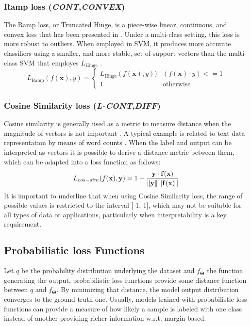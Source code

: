 \documentclass[sn-mathphys-num]{sn-jnl}%
\newcommand \cont{\textit{CONT}}
\newcommand \lcont{\textit{L-CONT}}
\newcommand \diff{\textit{DIFF}}
\newcommand \conv{\textit{CONVEX}}
\renewcommand\vec{\mathbf}
\begin{document}
\subsubsection{Ramp loss (\cont,\conv)}\label{ramp_loss}
The Ramp loss, or Truncated Hinge, is a piece-wise linear, continuous, and convex loss that has been presented in \cite{Wu2007RobustTH}.  Under a multi-class setting, this loss is more robust to outliers. When employed in SVM, it produces more accurate classifiers using a smaller, and more stable, set of support vectors than the multi-class SVM that employes $L_{\text{Hinge}}$ \cite{Lee02multicategorysupport}.
\begin{equation}
L_{\text{Ramp}}(f(\vec{x}), y) = \begin{cases}
L_{\text{Hinge}}(f(\vec{x}), y)) &(f(\vec{x}) \cdot y)<= 1\\
 1 & \text{otherwise}
\end{cases}
\end{equation}
\subsubsection{Cosine Similarity loss (\lcont,\diff)}
Cosine similarity is generally used as a metric to measure distance when the magnitude of vectors is not important \cite{ML_3}. A typical example is related to text data representation by means of word counts \cite{ML_2,ML_3}. When the label and output can be interpreted  as vectors it is possible to derive a distance metric between them, which can be adapted into a loss function as follows:
\begin{equation}
    L_{cos-sim}(f(\vec{x}), \vec{y}) = 1 - \frac{\vec{y} \cdot \vec{f(x)}}{\norm{\vec{y}}\norm{\vec{f(x)}}}
\end{equation}
It is important to underline that when using Cosine Similarity loss, the range of possible values is restricted to the interval [-1, 1], which may not be suitable for all types of data or applications, particularly when interpretability is a key requirement.


\subsection{Probabilistic loss Functions}\label{probabilistc_loss_functions}
Let $q$ be the probability distribution underlying the dataset and $f_{\vec{\Theta}}$ the function generating the output, probabilistic loss functions provide some distance function between $q$ and $f_{\vec{\Theta}}$. By minimizing that distance, the model output distribution converges to the ground truth one. Usually, models trained with probabilistic loss functions can provide a measure of how likely a sample is labeled with one class instead of another \cite{ML_2,ML_3,generative_models} providing richer information w.r.t. margin based.
\end{document}
